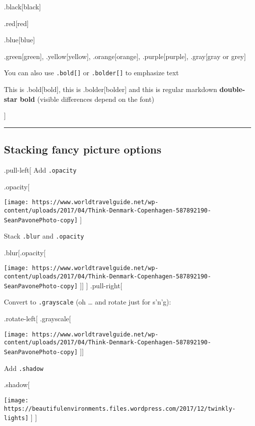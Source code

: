 \documentclass[]{article}
\begin{document}
.black{[}black{]}

.red{[}red{]}

.blue{[}blue{]}

.green{[}green{]}, .yellow{[}yellow{]}, .orange{[}orange{]},
.purple{[}purple{]}, .gray{[}gray or grey{]}

You can also use \texttt{.bold{[}{]}} or \texttt{.bolder{[}{]}} to
emphasize text

This is .bold{[}bold{]}, this is .bolder{[}bolder{]} and this is regular
markdown \textbf{double-star bold} (visible differences depend on the
font)

{]}

\begin{center}\rule{0.5\linewidth}{0.5pt}\end{center}

\hypertarget{stacking-fancy-picture-options}{%
\subsection{Stacking fancy picture
options}\label{stacking-fancy-picture-options}}

.pull-left{[} Add \texttt{.opacity}

.opacity{[}

\texttt{[image: https://www.worldtravelguide.net/wp-content/uploads/2017/04/Think-Denmark-Copenhagen-587892190-SeanPavonePhoto-copy]}
{]}

Stack \texttt{.blur} and \texttt{.opacity}

.blur{[}.opacity{[}

\texttt{[image: https://www.worldtravelguide.net/wp-content/uploads/2017/04/Think-Denmark-Copenhagen-587892190-SeanPavonePhoto-copy]}
{]}{]} {]} .pull-right{[}

Convert to \texttt{.grayscale} (oh \ldots{} and rotate just for s'n'g):

.rotate-left{[} .grayscale{[}

\texttt{[image: https://www.worldtravelguide.net/wp-content/uploads/2017/04/Think-Denmark-Copenhagen-587892190-SeanPavonePhoto-copy]}
{]}{]}

Add \texttt{.shadow}

.shadow{[}

\texttt{[image: https://beautifulenvironments.files.wordpress.com/2017/12/twinkly-lights]}
{]} {]}
\end{document}
